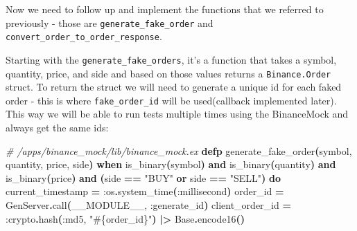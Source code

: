 \documentclass[
  oneside]{book}
\newenvironment{Shaded}{\begin{snugshade}}{\end{snugshade}}
\newcommand{\CommentTok}[1]{\textcolor[rgb]{0.56,0.35,0.01}{\textit{#1}}}
\newcommand{\ConstantTok}[1]{\textcolor[rgb]{0.56,0.35,0.01}{#1}}
\newcommand{\FunctionTok}[1]{\textcolor[rgb]{0.13,0.29,0.53}{\textbf{#1}}}
\newcommand{\KeywordTok}[1]{\textcolor[rgb]{0.13,0.29,0.53}{\textbf{#1}}}
\newcommand{\NormalTok}[1]{#1}
\newcommand{\OperatorTok}[1]{\textcolor[rgb]{0.81,0.36,0.00}{\textbf{#1}}}
\newcommand{\OtherTok}[1]{\textcolor[rgb]{0.56,0.35,0.01}{#1}}
\newcommand{\StringTok}[1]{\textcolor[rgb]{0.31,0.60,0.02}{#1}}
\newcommand{\VariableTok}[1]{\textcolor[rgb]{0.00,0.00,0.00}{#1}}
\begin{document}
Now we need to follow up and implement the functions that we referred to
previously - those are \texttt{generate\_fake\_order} and \texttt{convert\_order\_to\_order\_response}.

Starting with the \texttt{generate\_fake\_orders}, it's a function that takes a symbol, quantity, price, and side and based on those values returns a \texttt{Binance.Order} struct. To return the struct we will need to generate a unique id for each faked order - this is where \texttt{fake\_order\_id} will be used(callback implemented later). This way we will be able to run tests multiple times using the BinanceMock and always get the same ids:

\begin{Shaded}
\begin{Highlighting}[]
\CommentTok{\# /apps/binance\_mock/lib/binance\_mock.ex}
  \KeywordTok{defp}\NormalTok{ generate\_fake\_order}\FunctionTok{(}\NormalTok{symbol, quantity, price, side}\FunctionTok{)}
      \KeywordTok{when}\NormalTok{ is\_binary}\FunctionTok{(}\NormalTok{symbol}\FunctionTok{)} \KeywordTok{and}
\NormalTok{             is\_binary}\FunctionTok{(}\NormalTok{quantity}\FunctionTok{)} \KeywordTok{and}
\NormalTok{             is\_binary}\FunctionTok{(}\NormalTok{price}\FunctionTok{)} \KeywordTok{and}
             \FunctionTok{(}\NormalTok{side }\OperatorTok{==} \StringTok{"BUY"} \KeywordTok{or}\NormalTok{ side }\OperatorTok{==} \StringTok{"SELL"}\FunctionTok{)} \KeywordTok{do}
\NormalTok{    current\_timestamp }\OperatorTok{=} \VariableTok{:os}\OperatorTok{.}\NormalTok{system\_time}\FunctionTok{(}\VariableTok{:millisecond}\FunctionTok{)}
\NormalTok{    order\_id }\OperatorTok{=} \ConstantTok{GenServer}\OperatorTok{.}\NormalTok{call}\FunctionTok{(}\ConstantTok{\_\_MODULE\_\_}\NormalTok{, }\VariableTok{:generate\_id}\FunctionTok{)}
\NormalTok{    client\_order\_id }\OperatorTok{=} \VariableTok{:crypto}\OperatorTok{.}\NormalTok{hash}\FunctionTok{(}\VariableTok{:md5}\NormalTok{, }\StringTok{"}\OtherTok{\#\{}\NormalTok{order\_id}\OtherTok{\}}\StringTok{"}\FunctionTok{)} \OperatorTok{|\textgreater{}} \ConstantTok{Base}\OperatorTok{.}\NormalTok{encode16}\FunctionTok{()}


\end{Highlighting}
\end{Shaded}
\end{document}

